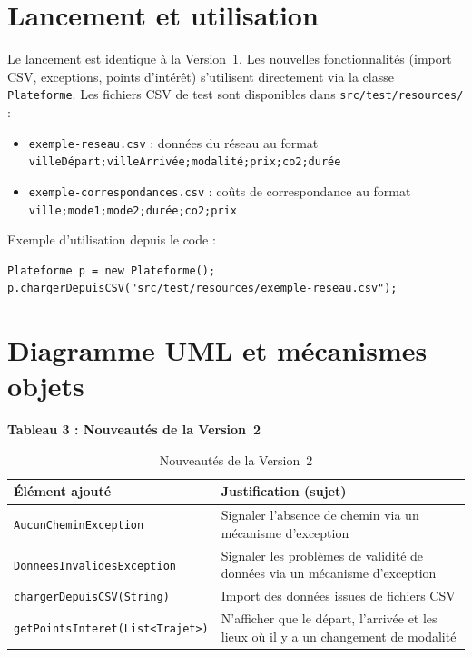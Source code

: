 \documentclass[fontsize=10pt,oneside,parskip=half]{scrreprt}
\newcommand{\ic}[1]{{\setlength{\fboxsep}{2pt}\colorbox{BeigeSerein}{\texttt{#1}}}}
\begin{document}
\section{Lancement et utilisation}

Le lancement est identique à la Version~1. Les nouvelles fonctionnalités (import CSV,
exceptions, points d'intérêt) s'utilisent directement via la classe \ic{Plateforme}.
Les fichiers CSV de test sont disponibles dans \ic{src/test/resources/} :

\begin{itemize}
  \item \ic{exemple-reseau.csv} : données du réseau au format
        \ic{villeDépart;villeArrivée;modalité;prix;co2;durée}
  \item \ic{exemple-correspondances.csv} : coûts de correspondance au format
        \ic{ville;mode1;mode2;durée;co2;prix}
\end{itemize}

Exemple d'utilisation depuis le code :

\begin{lstlisting}[style=java]
Plateforme p = new Plateforme();
p.chargerDepuisCSV("src/test/resources/exemple-reseau.csv");
\end{lstlisting}

\section{Diagramme UML et mécanismes objets}

\noindent\textbf{Tableau 3 : Nouveautés de la Version~2}

\begin{table}[H]
  \centering
  \begin{tabularx}{\textwidth}{lX}
    \toprule
    \textbf{Élément ajouté} & \textbf{Justification (sujet)} \\
    \midrule
    \ic{AucunCheminException}      & Signaler l'absence de chemin via un mécanisme d'exception \\
    \ic{DonneesInvalidesException} & Signaler les problèmes de validité de données via un mécanisme d'exception \\
    \ic{chargerDepuisCSV(String)}  & Import des données issues de fichiers CSV \\
    \ic{getPointsInteret(List<Trajet>)} & N'afficher que le départ, l'arrivée et les lieux où il y a un changement de modalité \\
    \bottomrule
  \end{tabularx}
  \caption{Nouveautés de la Version~2}
\end{table}
\end{document}
